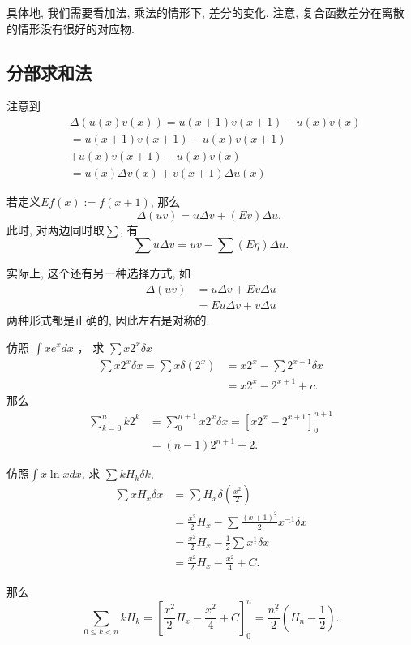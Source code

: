 \documentclass{ctexart}
\begin{document}
具体地, 我们需要看加法, 乘法的情形下, 差分的变化. 注意, 复合函数差分在离散的情形没有很好的对应物.

\subsection{分部求和法}
注意到
$$
	\begin{aligned}
		 & \Delta(u(x) v(x))= u(x+1) v(x+1)-u(x) v(x) \\
		 & = u(x+1) v(x+1)-u(x) v(x+1)                \\
		 & +u(x) v(x+1)-u(x) v(x)                     \\
		 & =u(x) \Delta v(x)+v(x+1) \Delta u(x)
	\end{aligned}
$$

若定义$E f(x):=f(x+1)$, 那么
$$
	\Delta(u v)=u \Delta v+(E v) \Delta u \text {. }
$$
此时, 对两边同时取$\sum$, 有
$$
	\sum u \Delta v=u v-\sum(E \eta) \Delta u .
$$
\begin{remark}
	实际上, 这个还有另一种选择方式, 如
	$$
		\begin{aligned}
			\Delta(u v) & =u \Delta v+E v \Delta u \\
			            & =E u \Delta v+v \Delta u
		\end{aligned}
	$$
	两种形式都是正确的, 因此左右是对称的.
\end{remark}

\begin{example}仿照 $\int x e^x d x$ ， 求 $\sum x 2^x \delta x$
	$$
		\begin{aligned} \sum x\boxed{2^x} \delta x=\sum x \delta\left(2^x\right) & =x 2^x-\sum 2^{\boxed{x+1}} \delta x \\ & =x 2^x-2^{x+1}+c .\end{aligned}
	$$
	那么
	$$
		\begin{aligned}
			\sum_{k=0}^n k 2^k & =\sum_0^{n+1} x 2^x \delta x=\left[x 2^x-2^{x+1}\right]_0^{n+1} \\
			                   & =(n-1) 2^{n+1}+2 .
		\end{aligned}
	$$
\end{example}

\begin{example}仿照$\int x \ln x d x$, 求 $\sum k H_k \delta k$,
	$$
		\begin{aligned}
			\sum \boxed{x} H_x \delta x & = \sum H_x \delta\left(\frac{x^{\underline{2}}}{2}\right)                                \\
			                            & = \frac{x^2}{2} H_x - \sum \frac{(x+1)^{\underline{2}}}{{2}} x^{\underline{-1}} \delta x \\
			                            & = \frac{x^2}{2} H_x - \frac{1}{2} \sum x^{\underline{1}} \delta x                        \\
			                            & = \frac{x^2}{2} H_x - \frac{x^2}{4} + C.
		\end{aligned}
	$$

	那么
	$$
		\sum_{0 \leqslant k<n} k H_k=\left[\frac{x^2}{2} H_x-\frac{x^2}{4}+C\right]_0^n=\frac{n^{\underline{2}}}{2}\left(H_n-\frac{1}{2}\right) .
	$$

\end{example}
\end{document}
